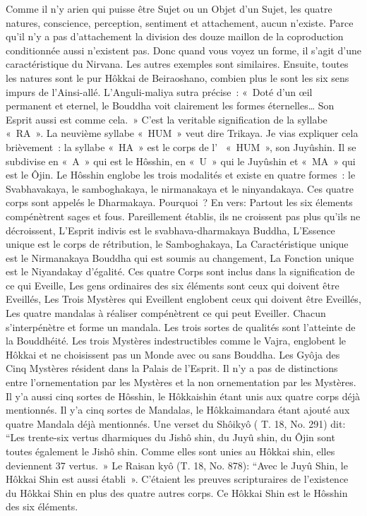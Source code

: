 Comme il n’y arien qui puisse être  Sujet ou un Objet d’un Sujet, les quatre natures, conscience, perception, sentiment et attachement, aucun n’existe. Parce qu’il n’y a pas d’attachement la division des douze maillon de la coproduction conditionnée aussi n’existent pas. Donc quand vous voyez un forme, il s’agit d’une caractéristique du Nirvana. Les autres exemples sont similaires.
Ensuite, toutes les natures sont le pur Hôkkai de Beiraoshano, combien plus le sont les six sens impurs de l’Ainsi-allé. L’Anguli-maliya sutra précise : « Doté d’un œil permanent et eternel, le Bouddha voit clairement les formes éternelles… Son Esprit aussi est comme cela. »
C’est la veritable signification de la syllabe « RA ». La neuvième syllabe « HUM » veut dire Trikaya. Je vias expliquer cela brièvement : la syllabe « HA » est le corps de l’  « HUM », son Juyûshin. Il se subdivise en « A » qui est le Hôsshin, en « U » qui le Juyûshin et « MA » qui est le Ôjin. Le Hôsshin englobe les trois modalités et  existe en quatre formes : le Svabhavakaya, le samboghakaya, le nirmanakaya et le ninyandakaya. Ces quatre corps sont appelés le Dharmakaya. Pourquoi ? En vers:
Partout les six élements compénètrent sages et fous.
Pareillement établis, ils ne croissent pas plus qu’ils ne décroissent,
L’Esprit indivis est le svabhava-dharmakaya Buddha,
L’Essence unique est le corps de rétribution, le Samboghakaya,
La Caractéristique unique est le Nirmanakaya Bouddha qui est soumis au changement,
La Fonction unique est le Niyandakay d’égalité.
Ces quatre Corps sont inclus dans la signification de ce qui Eveille,
Les gens ordinaires des six éléments sont ceux qui doivent être Eveillés,
Les Trois Mystères qui Eveillent englobent ceux qui doivent être Eveillés,
Les quatre mandalas à réaliser compénètrent ce qui peut Eveiller.
Chacun s’interpénètre et forme un mandala.
Les trois sortes de qualités sont l’atteinte de la Bouddhéité.
Les trois Mystères indestructibles comme le Vajra, englobent le Hôkkai et ne choisissent pas un Monde avec ou sans Bouddha.
Les Gyôja des Cinq Mystères résident dans la Palais de l’Esprit.
Il n’y a pas de distinctions entre l’ornementation par  les Mystères et la non ornementation par les Mystères.
Il y’a aussi cinq sortes de Hôsshin, le Hôkkaishin étant unis aux quatre corps déjà mentionnés. Il y’a cinq sortes de Mandalas, le Hôkkaimandara étant ajouté aux quatre Mandala déjà mentionnés. Une verset du Shôikyô ( T. 18, No. 291) dit:  “Les trente-six vertus dharmiques du Jishô shin, du Juyû shin, du Ôjin sont toutes également le Jishô shin. Comme elles sont unies au Hôkkai shin, elles deviennent 37 vertus. » Le Raisan kyô (T. 18, No. 878): “Avec le Juyû Shin, le Hôkkai Shin est aussi établi ».  C’étaient les preuves scripturaires de l’existence du Hôkkai Shin en plus des quatre autres corps. Ce Hôkkai Shin est le Hôsshin des six éléments.
